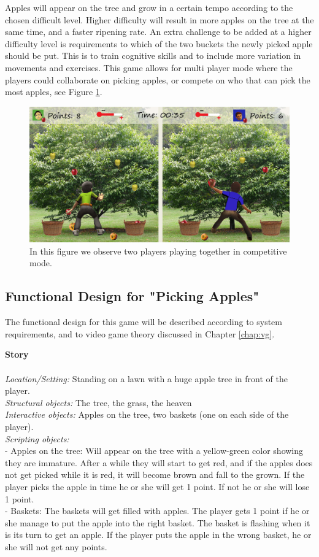 Apples will appear on the tree and grow in a certain tempo according to the chosen difficult level. Higher difficulty will result in more apples on the tree at the same time, and a faster ripening rate. An extra challenge to be added at a higher difficulty level is requirements to which of the two buckets the newly picked apple should be put. This is to train cognitive skills and to include more variation in movements and exercises. This game allows for multi player mode where the players could collaborate on picking apples, or compete on who that can pick the most apples, see Figure \ref{fig:appleMultiplayer}. 


\begin{figure} [H]
\centering
\includegraphics[scale=0.075]{gameapple2playerEngelsk.jpg}
\caption[Picking apples - multi player]{In this figure we observe two players playing together in competitive mode.}
\label{fig:appleMultiplayer}
\end{figure}


\subsection{Functional Design for "Picking Apples"}
The functional design for this game will be described according to system requirements, and to video game theory discussed in Chapter \ref{chap:vg}.

\textbf{Story} \\ \\
\emph{Location/Setting:} Standing on a lawn with a huge apple tree in front of the player. \\
\emph{Structural objects:} The tree, the grass, the heaven \\
\emph{Interactive objects:} Apples on the tree, two baskets (one on each side of the player). \\
\emph{Scripting objects:} \\
- Apples on the tree: Will appear on the tree with a yellow-green color showing they are immature. After a while they will start to get red, and if the apples does not get picked while it  is red, it will become brown and fall to the grown. If the player picks the apple in time he or she will get 1 point. If not he or she will lose 1 point. \\
- Baskets: The baskets will get filled with apples. The player gets 1 point if he or she manage to put the apple into the right basket. The basket is flashing when it is its turn to get an apple. If the player puts the apple in the wrong basket, he or she will not get any points. 


